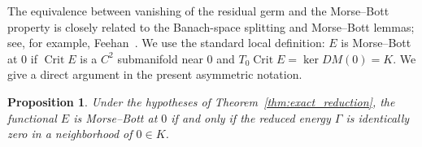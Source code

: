 \documentclass[11pt]{article}
\newtheorem{proposition}[theorem]{Proposition}
\theoremstyle{definition}
\theoremstyle{remark}
\begin{document}
The equivalence between vanishing of the residual germ and the Morse--Bott property is closely related to the Banach-space splitting and Morse--Bott lemmas; see, for example, Feehan~\cite[Theorems~5 and~2.14]{Feehan2020}. We use the standard local definition: $E$ is Morse--Bott at $0$ if $\operatorname{Crit}E$ is a $C^2$ submanifold near $0$ and $T_0\operatorname{Crit}E=\ker DM(0)=K$. We give a direct argument in the present asymmetric notation.

\begin{proposition} \label{prop:morse_bott_reduction}
Under the hypotheses of Theorem~\ref{thm:exact_reduction}, the functional $E$ is Morse--Bott at $0$ if and only if the reduced energy $\Gamma$ is identically zero in a neighborhood of $0 \in K$. 
\end{proposition}
\end{document}
